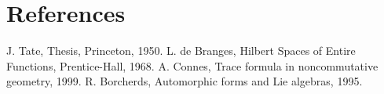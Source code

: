 \section{References}
\begin{thebibliography}{99}
 J. Tate, Thesis, Princeton, 1950.
 L. de Branges, Hilbert Spaces of Entire Functions, Prentice-Hall, 1968.
 A. Connes, Trace formula in noncommutative geometry, 1999.
 R. Borcherds, Automorphic forms and Lie algebras, 1995.
\end{thebibliography}